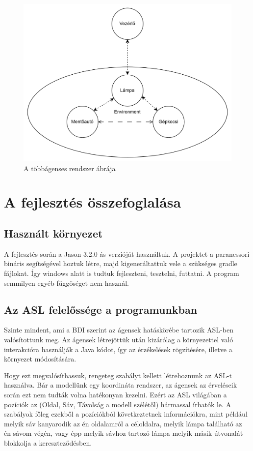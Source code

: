\documentclass[a4paper, 11pt]{article}
\begin{document}
\begin{figure}
    \centering
    \includegraphics[width=\linewidth, keepaspectratio]{multiagent_diagram.png}
    \caption{A többágenses rendszer ábrája}
\end{figure}

\FloatBarrier

\section{A fejlesztés összefoglalása}
\subsection{Használt környezet}
A fejlesztés során a Jason 3.2.0-ás verzióját használtuk. A projektet a parancssori bináris segítségével
hoztuk létre, majd kigeneráltattuk vele a szükséges gradle fájlokat. Így windows alatt is tudtuk fejleszteni,
tesztelni, futtatni. A program semmilyen egyéb függőséget nem használ.
\subsection{Az ASL felelőssége a programunkban}\label{subsec:asl}
Szinte mindent, ami a BDI szerint az ágensek hatáskörébe tartozik ASL-ben valósítottunk meg. Az ágensek
létrejöttük után kizárólag a környezettel való interakcióra használják a Java kódot, így az érzékelések
rögzítésére, illetve a környezet módosítására.

Hogy ezt megvalósíthassuk, rengeteg szabályt kellett létrehoznunk az ASL-t használva. Bár a modellünk
egy koordináta rendszer, az ágensek az érveléseik során ezt nem tudták volna hatékonyan kezelni.
Ezért az ASL világában a pozíciók az (Oldal, Sáv, Távolság a modell szélétől) hármassal írhatók le.
A szabályok főleg ezekből a pozíciókból következtetnek információkra, mint például melyik sáv kanyarodik
az én oldalamról a céloldalra, melyik lámpa található az én sávom végén, vagy épp melyik sávhoz tartozó
lámpa melyik másik útvonalát blokkolja a kereszteződésben.
\end{document}
